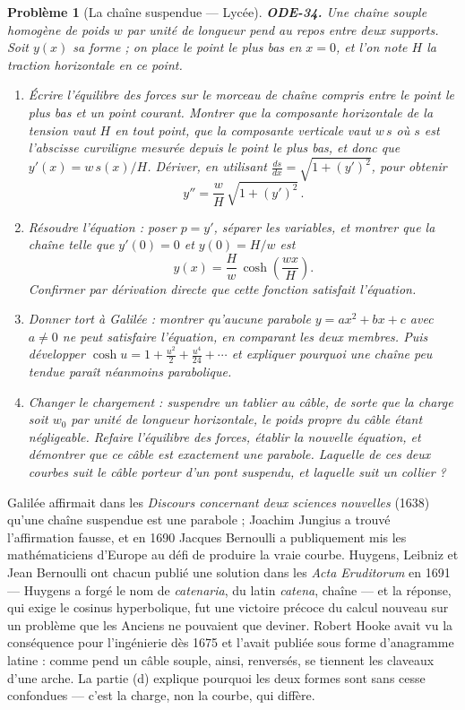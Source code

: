 \documentclass[11pt]{article}
\newtheorem{problem}{Problème}
\begin{document}
\begin{problem}[{La chaîne suspendue --- Lycée}]
\textbf{ODE-34.} Une chaîne souple homogène de poids $ w $ par unité de longueur pend au
repos entre deux supports. Soit $ y(x) $ sa forme ; on place le point le plus bas en
$ x = 0 $, et l'on note $ H $ la traction horizontale en ce point.
\begin{enumerate}
\item[(a)] Écrire l'équilibre des forces sur le morceau de chaîne compris entre le point le plus bas
et un point courant. Montrer que la composante horizontale de la tension vaut $ H $ en tout
point, que la composante verticale vaut $ w\,s $ où $ s $ est l'abscisse curviligne mesurée
depuis le point le plus bas, et donc que $ y'(x) = w\,s(x)/H $. Dériver, en utilisant
$ \frac{ds}{dx} = \sqrt{1 + (y')^2} $, pour obtenir
\[ y'' = \frac{w}{H}\,\sqrt{1 + (y')^2}\,. \]
\item[(b)] Résoudre l'équation : poser $ p = y' $, séparer les variables, et montrer que la chaîne
telle que $ y'(0) = 0 $ et $ y(0) = H/w $ est
\[ y(x) = \frac{H}{w}\,\cosh\!\left( \frac{w x}{H} \right). \]
Confirmer par dérivation directe que cette fonction satisfait l'équation.
\item[(c)] Donner tort à Galilée : montrer qu'aucune parabole $ y = ax^2 + bx + c $ avec $ a \ne 0 $
ne peut satisfaire l'équation, en comparant les deux membres. Puis développer
$ \cosh u = 1 + \frac{u^2}{2} + \frac{u^4}{24} + \cdots $ et expliquer pourquoi une chaîne peu
tendue paraît néanmoins parabolique.
\item[(d)] Changer le chargement : suspendre un tablier au câble, de sorte que la charge soit $ w_0 $
par unité de longueur \textit{horizontale}, le poids propre du câble étant négligeable. Refaire
l'équilibre des forces, établir la nouvelle équation, et démontrer que ce câble est exactement
une parabole. Laquelle de ces deux courbes suit le câble porteur d'un pont suspendu, et laquelle
suit un collier ?
\end{enumerate}

\end{problem}

\noindent Galilée affirmait dans les \textit{Discours concernant deux sciences nouvelles}
(1638) qu'une chaîne suspendue est une parabole ; Joachim Jungius a trouvé l'affirmation fausse,
et en 1690 Jacques Bernoulli a publiquement mis les mathématiciens d'Europe au défi de produire
la vraie courbe. Huygens, Leibniz et Jean Bernoulli ont chacun publié une solution dans les
\textit{Acta Eruditorum} en 1691 --- Huygens a forgé le nom de \textit{catenaria}, du latin
\textit{catena}, chaîne --- et la réponse, qui exige le cosinus hyperbolique, fut une victoire
précoce du calcul nouveau sur un problème que les Anciens ne pouvaient que deviner. Robert Hooke
avait vu la conséquence pour l'ingénierie dès 1675 et l'avait publiée sous forme d'anagramme
latine : comme pend un câble souple, ainsi, renversés, se tiennent les claveaux d'une arche. La
partie (d) explique pourquoi les deux formes sont sans cesse confondues --- c'est la charge, non la
courbe, qui diffère.
\end{document}

